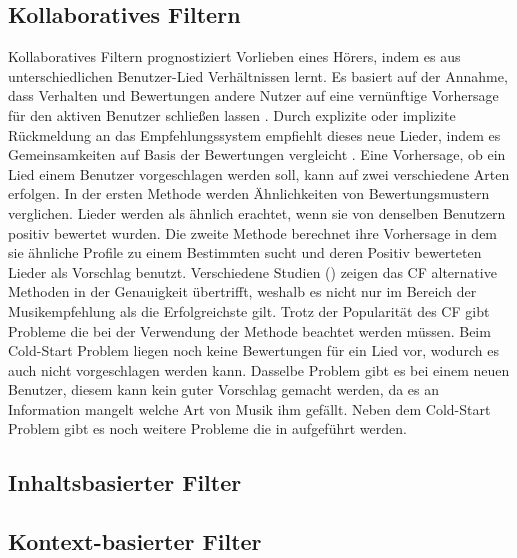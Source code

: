 \documentclass[twosided,a4,10pt]{article}
\begin{document}
\begin{multicols}{2}
\subsection{Kollaboratives Filtern}
Kollaboratives Filtern prognostiziert Vorlieben eines Hörers, indem es aus unterschiedlichen Benutzer-Lied Verhältnissen lernt. Es basiert auf der Annahme, dass Verhalten und Bewertungen andere Nutzer auf eine vernünftige Vorhersage für den aktiven Benutzer schließen lassen \cite{celma}. Durch explizite oder implizite Rückmeldung an das Empfehlungssystem empfiehlt dieses neue Lieder, indem es Gemeinsamkeiten auf Basis der Bewertungen vergleicht \cite{mcfee}.\newline
Eine Vorhersage, ob ein Lied einem Benutzer vorgeschlagen werden soll, kann auf zwei verschiedene Arten erfolgen. In der ersten Methode werden Ähnlichkeiten von Bewertungsmustern verglichen. Lieder werden als ähnlich erachtet, wenn sie von denselben Benutzern positiv bewertet wurden. Die zweite Methode berechnet ihre Vorhersage in dem sie ähnliche Profile zu einem Bestimmten sucht und deren Positiv bewerteten Lieder als Vorschlag benutzt. \cite{ekstrandand}\newline
Verschiedene Studien (\cite{mcfee}\cite{barrington}) zeigen das CF alternative Methoden in der Genauigkeit übertrifft, weshalb es nicht nur im Bereich der Musikempfehlung als die Erfolgreichste gilt.\newline
Trotz der Popularität des CF gibt Probleme die bei der Verwendung der Methode beachtet werden müssen. Beim Cold-Start Problem liegen noch keine Bewertungen für ein Lied vor, wodurch es auch nicht vorgeschlagen werden kann. Dasselbe Problem gibt es bei einem neuen Benutzer, diesem kann kein guter Vorschlag gemacht werden, da es an Information mangelt welche Art von Musik ihm gefällt. \cite{celma} Neben dem Cold-Start Problem gibt es noch weitere Probleme die in \cite{celma} aufgeführt werden.

\subsection{Inhaltsbasierter Filter}

\subsection{Kontext-basierter Filter}


\end{multicols}
\end{document}
